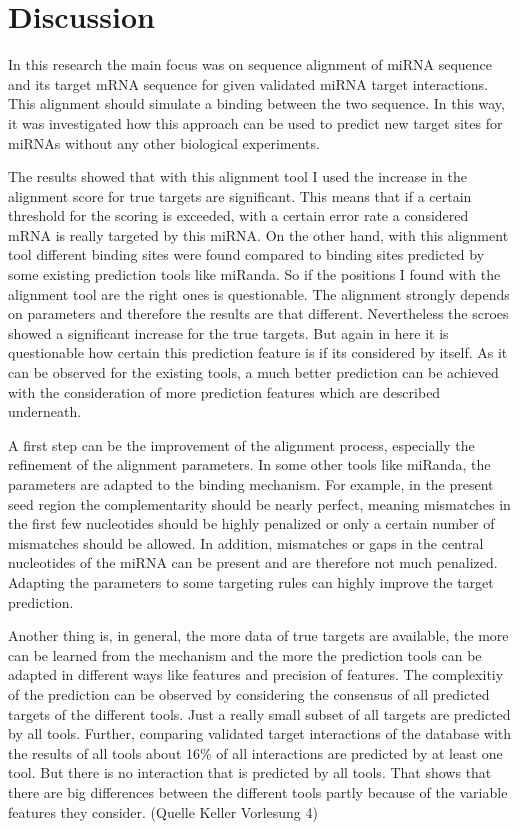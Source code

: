 \documentclass[12pt]{article}
\begin{document}
\section{Discussion}

In this research the main focus was on sequence alignment of miRNA sequence and its target mRNA sequence for given validated miRNA target interactions. This alignment should simulate a binding between the two sequence. In this way, it was investigated how this approach can be used to predict new target sites for miRNAs without any other biological experiments.

The results showed that with this alignment tool I used the increase in the alignment score for true targets are significant. This means that if a certain threshold for the scoring is exceeded, with a certain error rate a considered mRNA is really targeted by this miRNA. On the other hand, with this alignment tool different binding sites were found compared to binding sites predicted by some existing prediction tools like miRanda. So if the positions I found with the alignment tool are the right ones is questionable. The alignment strongly depends on parameters and therefore the results are that different. Nevertheless the scroes showed a significant increase for the true targets. But again in here it is questionable how certain this prediction feature is if its considered by itself. As it can be observed for the existing tools, a much better prediction can be achieved with the consideration of more prediction features which are described underneath.

A first step can be the improvement of the alignment process, especially the refinement of the alignment parameters. In some other tools like miRanda, the parameters are adapted to the binding mechanism. For example, in the present seed region the complementarity should be nearly perfect, meaning mismatches in the first few nucleotides should be highly penalized or only a certain number of mismatches should be allowed. In addition, mismatches or gaps in the central nucleotides of the miRNA can be present and are therefore not much penalized. Adapting the parameters to some targeting rules can highly improve the target prediction. 

Another thing is, in general, the more data of true targets are available, the more can be learned from the mechanism and the more the prediction tools can be adapted in different ways like features and precision of features.
The complexitiy of the prediction can be observed by considering the consensus of all predicted targets of the different tools. Just a really small subset of all targets are predicted by all tools. Further, comparing validated target interactions of the database with the results of all tools about 16\% of all interactions are predicted by at least one tool. But there is no interaction that is predicted by all tools. That shows that there are big differences between the different tools partly because of the variable features they consider. (Quelle Keller Vorlesung 4) 
\end{document}
